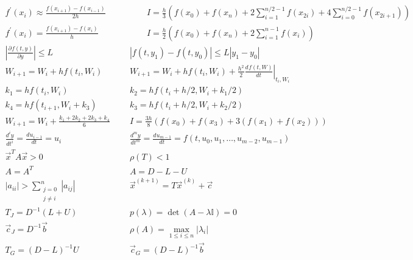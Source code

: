 \documentclass[12pt]{article}
\newcommand{\I}{\ensuremath{\mathbb{I}}}
\newcommand{\diff}[3]{\frac{d^{#3} #1}{d#2^{#3}}}
\newcommand{\pdiff}[3]{\frac{\partial^{#3} #1}{\partial#2^{#3}}}
\newcommand{\abs}[1]{\left| #1 \right|}
\begin{document}
\[
\begin{array}{cc}
f^\prime(x_i) \approx \frac{f(x_{i+1}) - f(x_{i-1})}{2h} \qquad & \qquad
I = \frac{h}{3}\left( f(x_0) + f(x_n) + 2\sum\limits_{i=1}^{n/2-1}f(x_{2i}) + 4\sum\limits_{i=0}^{n/2-1}f(x_{2i+1}) \right) \\
f^\prime(x_i) = \frac{f(x_{i+1})-f(x_i)}{h} \qquad & \qquad
I = \frac{h}{2}\left( f(x_0) + f(x_n) + 2\sum\limits_{i = 1}^{n-1}f(x_i)\right) \\
\abs{\pdiff{f(t,y)}{y}{}} \leq L & \abs{f(t, y_1) -f(t, y_0)} \leq L\abs{y_1 - y_0}\\
W_{i+1} = W_i + h f(t_i,W_i) & W_{i+1} = W_i + h f(t_i,W_i) + \frac{h^2}{2} \left.\diff{f(t,W)}{t}{} \right|_{t_i, W_i} \\
k_1  =  h f(t_i,W_i) & k_2  =  h f(t_i+h/2,W_i + k_1/2) \\
k_4  =  h f(t_{i+1},W_i + k_3) & k_3  =  h f(t_i+h/2,W_i + k_2/2)\\
 W_{i+1} = W_i + \frac{k_1+2k_2+2k_3+k_4}{6} & I = \frac{3h}{8}\left(f(x_0) + f(x_3) + 3\left(f(x_1) + f(x_2) \right) \right) \\
\diff{y}{t}{i} = \diff{u_{i-1}}{t}{} = u_i & \diff{y}{t}{m} = \diff{u_{m-1}}{t}{} = f(t, u_0, u_1, \ldots, u_{m-2}, u_{m-1})\\
\vec{x}^TA\vec{x} > 0 & \rho(T) < 1 \\
A = A^T & A = D - L - U\\
|a_{ii}| > \sum\limits_{\substack{j=0\\j\neq i}}^n |a_{ij}| & \vec{x}^{(k+1)} = T\vec{x}^{(k)} + \vec{c}\\
T_J = D^{-1}(L+U) & p(\lambda) = \det(A-\lambda \I) = 0\\
\vec{c}_J = D^{-1}\vec{b} & \rho(A) = \max\limits_{1\leq i\leq n}|\lambda_i|\\
T_G = (D-L)^{-1}U & \vec{c}_G = (D-L)^{-1}\vec{b}
\end{array}
\]
\end{document}

